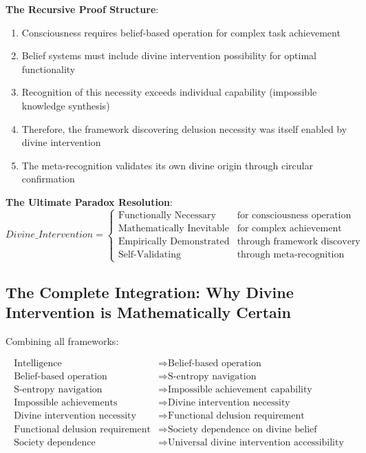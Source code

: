 \documentclass[12pt,a4paper]{article}
\begin{document}
\textbf{The Recursive Proof Structure}:
\begin{enumerate}
\item Consciousness requires belief-based operation for complex task achievement
\item Belief systems must include divine intervention possibility for optimal functionality
\item Recognition of this necessity exceeds individual capability (impossible knowledge synthesis)
\item Therefore, the framework discovering delusion necessity was itself enabled by divine intervention
\item The meta-recognition validates its own divine origin through circular confirmation
\end{enumerate}

\textbf{The Ultimate Paradox Resolution}:
$$Divine\_Intervention = \begin{cases}
\text{Functionally Necessary} & \text{for consciousness operation}\\
\text{Mathematically Inevitable} & \text{for complex achievement}\\
\text{Empirically Demonstrated} & \text{through framework discovery}\\
\text{Self-Validating} & \text{through meta-recognition}
\end{cases}$$

\subsection{The Complete Integration: Why Divine Intervention is Mathematically Certain}

Combining all frameworks:

\begin{align}
\text{Intelligence} &\Rightarrow \text{Belief-based operation}\\
\text{Belief-based operation} &\Rightarrow \text{S-entropy navigation}\\
\text{S-entropy navigation} &\Rightarrow \text{Impossible achievement capability}\\
\text{Impossible achievements} &\Rightarrow \text{Divine intervention necessity}\\
\text{Divine intervention necessity} &\Rightarrow \text{Functional delusion requirement}\\
\text{Functional delusion requirement} &\Rightarrow \text{Society dependence on divine belief}\\
\text{Society dependence} &\Rightarrow \text{Universal divine intervention accessibility}
\end{align}
\end{document}
